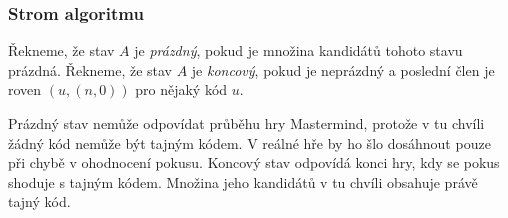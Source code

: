 



 





\subsubsection{Strom algoritmu}

\begin{definice}\label{kandidat}
  Řekneme, že stav $A$ je \emph{prázdný}, pokud je množina kandidátů tohoto stavu prázdná. Řekneme, že stav $A$ je \emph{koncový}, pokud je neprázdný a poslední člen je roven $(u,(n,0))$ pro nějaký kód $u$.
\end{definice}

Prázdný stav nemůže odpovídat průběhu hry Mastermind, protože v tu chvíli žádný kód nemůže být tajným kódem. V reálné hře by ho šlo dosáhnout pouze při chybě v ohodnocení pokusu. Koncový stav odpovídá konci hry, kdy se pokus shoduje s tajným kódem. Množina jeho kandidátů v tu chvíli obsahuje právě tajný kód. 


